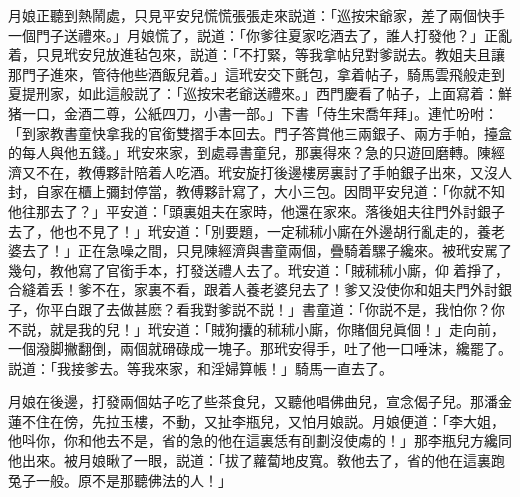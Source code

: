 月娘正聽到熱鬧處，只見平安兒慌慌張張走來説道：「巡按宋爺家，差了兩個快手一個門子送禮來。」月娘慌了，説道：「你爹往夏家吃酒去了，誰人打發他？」正亂着，只見玳安兒放進毡包來，説道：「不打緊，等我拿帖兒對爹説去。教姐夫且讓那門子進來，管待他些酒飯兒着。」這玳安交下氈包，拿着帖子，騎馬雲飛般走到夏提刑家，如此這般説了：「巡按宋老爺送禮來。」西門慶看了帖子，上面寫着：鮮猪一口，金酒二尊，公紙四刀，小書一部。」下書「侍生宋喬年拜」。連忙吩咐：「到家教書童快拿我的官銜雙摺手本回去。門子答賞他三兩銀子、兩方手帕，擡盒的每人與他五錢。」玳安來家，到處尋書童兒，那裏得來？急的只遊回磨轉。陳經濟又不在，教傅夥計陪着人吃酒。玳安旋打後邊樓房裏討了手帕銀子出來，又沒人封，自家在櫃上彌封停當，教傅夥計寫了，大小三包。因問平安兒道：「你就不知他往那去了？」平安道：「頭裏姐夫在家時，他還在家來。落後姐夫往門外討銀子去了，他也不見了！」玳安道：「別要題，一定秫秫小廝在外邊胡行亂走的，養老婆去了！」正在急噪之間，只見陳經濟與書童兩個，疊騎着騾子纔來。被玳安駡了幾句，教他寫了官銜手本，打發送禮人去了。玳安道：「賊秫秫小廝，仰𢵞着掙了，合縫着丢！爹不在，家裏不看，跟着人養老婆兒去了！爹又没使你和姐夫門外討銀子，你平白跟了去做甚麽？看我對爹説不説！」書童道：「你説不是，我怕你？你不説，就是我的兒！」玳安道：「賊狗攮的秫秫小廝，你賭個兒眞個！」走向前，一個潑脚撇翻倒，兩個就磆碌成一塊子。那玳安得手，吐了他一口唾沫，纔罷了。説道：「我接爹去。等我來家，和淫婦算帳！」騎馬一直去了。

月娘在後邊，打發兩個姑子吃了些茶食兒，又聽他唱佛曲兒，宣念偈子兒。那潘金蓮不住在傍，先拉玉樓，不動，又扯李瓶兒，又怕月娘説。月娘便道：「李大姐，他呌你，你和他去不是，省的急的他在這裏恁有㓦劃沒使䖏的！」那李瓶兒方纔同他出來。被月娘瞅了一眼，説道：「拔了蘿蔔地皮寬。敎他去了，省的他在這裏跑兔子一般。原不是那聽佛法的人！」

